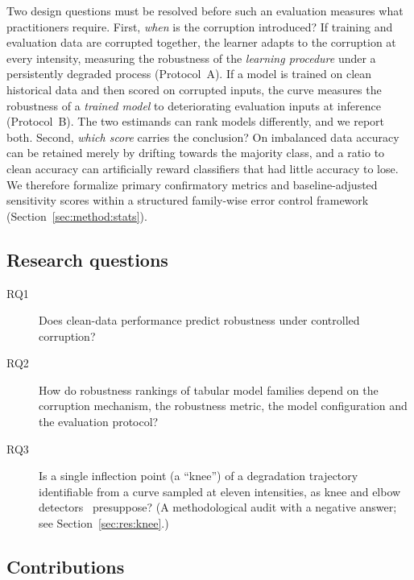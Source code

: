\documentclass[pdflatex,sn-mathphys]{sn-jnl}
\theoremstyle{thmstyleone}
\theoremstyle{thmstyletwo}
\theoremstyle{thmstylethree}
\begin{document}
Two design questions must be resolved before such an evaluation measures what practitioners require. First, \emph{when} is the corruption introduced? If training and evaluation data are corrupted together, the learner adapts to the corruption at every intensity, measuring the robustness of the \emph{learning procedure} under a persistently degraded process (Protocol~A). If a model is trained on clean historical data and then scored on corrupted inputs, the curve measures the robustness of a \emph{trained model} to deteriorating evaluation inputs at inference (Protocol~B). The two estimands can rank models differently, and we report both. Second, \emph{which score} carries the conclusion? On imbalanced data accuracy can be retained merely by drifting towards the majority class, and a ratio to clean accuracy can artificially reward classifiers that had little accuracy to lose. We therefore formalize primary confirmatory metrics and baseline-adjusted sensitivity scores within a structured family-wise error control framework (Section~\ref{sec:method:stats}).

\subsection{Research questions}\label{sec:intro:rq}

\begin{description}
\item[RQ1] Does clean-data performance predict robustness under controlled corruption?
\item[RQ2] How do robustness rankings of tabular model families depend on the corruption mechanism, the robustness metric, the model configuration and the evaluation protocol?
\item[RQ3] Is a single inflection point (a ``knee'') of a degradation trajectory identifiable from a curve sampled at eleven intensities, as knee and elbow detectors~\cite{satopaa2011finding,salvador2004determining} presuppose? (A methodological audit with a negative answer; see Section~\ref{sec:res:knee}.)
\end{description}

\subsection{Contributions}\label{sec:intro:contrib}
\end{document}
